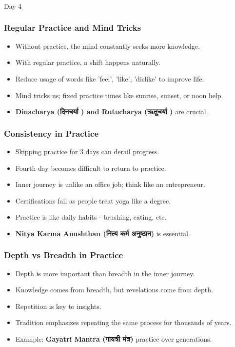 \begin{frame}[fragile]\frametitle{}
\begin{center}
{\Large Day 4}
\end{center}
\end{frame}

\begin{frame}[fragile]\frametitle{Regular Practice and Mind Tricks}
      \begin{itemize}
        \item Without practice, the mind constantly seeks more knowledge.
        \item With regular practice, a shift happens naturally.
        \item Reduce usage of words like 'feel', 'like', 'dislike' to improve life.
        \item Mind tricks us; fixed practice times like sunrise, sunset, or noon help.
        \item \textbf{Dinacharya (दिनचर्या ) and Rutucharya (ऋतुचर्या )} are crucial.
      \end{itemize}
\end{frame}

\begin{frame}[fragile]\frametitle{Consistency in Practice}
      \begin{itemize}
        \item Skipping practice for 3 days can derail progress.
        \item Fourth day becomes difficult to return to practice.
        \item Inner journey is unlike an office job; think like an entrepreneur.
        \item Certifications fail as people treat yoga like a degree.
        \item Practice is like daily habits - brushing, eating, etc.
        \item \textbf{Nitya Karma Anushthan (नित्य कर्म अनुष्ठान)} is essential.
      \end{itemize}
\end{frame}

\begin{frame}[fragile]\frametitle{Depth vs Breadth in Practice}
      \begin{itemize}
        \item Depth is more important than breadth in the inner journey.
        \item Knowledge comes from breadth, but revelations come from depth.
        \item Repetition is key to insights.
        \item Tradition emphasizes repeating the same process for thousands of years.
        \item Example: \textbf{Gayatri Mantra (गायत्री मंत्र)} practice over generations.
      \end{itemize}
\end{frame}

